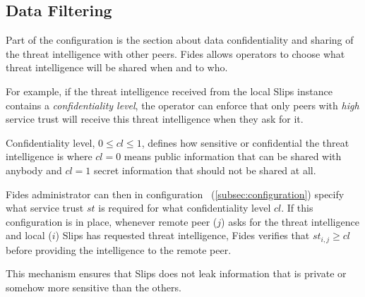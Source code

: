 \subsection{Data Filtering}
\label{subsec:data-filtering}
Part of the configuration is the section about data confidentiality and sharing of the threat intelligence with other peers.
Fides allows operators to choose what threat intelligence will be shared when and to who.

For example, if the threat intelligence received from the local Slips instance contains a \textit{confidentiality level}, the operator can enforce that only peers with \textit{high} service trust will receive this threat intelligence when they ask for it.

Confidentiality level, $0 \leq cl \leq 1$, defines how sensitive or confidential the threat intelligence is where $cl = 0$ means public information that can be shared with anybody and $cl = 1$ secret information that should not be shared at all.

Fides administrator can then in configuration ~(\ref{subsec:configuration}) specify what service trust $st$ is required for what confidentiality level $cl$.
If this configuration is in place, whenever remote peer ($j$) asks for the threat intelligence and local ($i$) Slips has requested threat intelligence, Fides verifies that $st_{i, j} \geq cl$ before providing the intelligence to the remote peer.

This mechanism ensures that Slips does not leak information that is private or somehow more sensitive than the others.